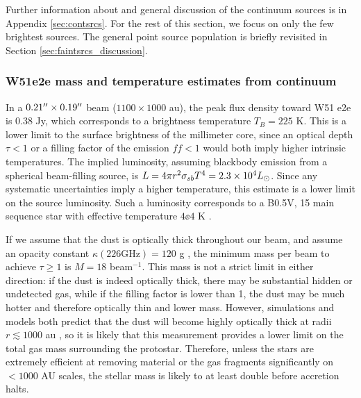 \documentclass{emulateapj}
\begin{document}
Further information about and general discussion of the continuum sources is in
Appendix \ref{sec:contsrcs}.  For the rest of this section, we focus on only
the few brightest sources.  The general point source population is briefly
revisited in Section \ref{sec:faintsrcs_discussion}.








\subsubsection{W51e2e mass and temperature estimates from continuum}
\label{sec:W51e2e}

In a $0.21\mbox{$^{\prime\prime}$}\times0.19\mbox{$^{\prime\prime}$}$ beam ($1100\times1000$ au), the peak flux
density toward W51 e2e is 0.38 Jy, which corresponds to a brightness
temperature $T_B=225$ K.  This is a lower limit to the surface brightness of
the millimeter core, since an optical depth $\tau<1$ or a filling factor of the
emission $ff<1$ would both imply higher intrinsic temperatures.  The implied
luminosity, assuming blackbody emission from a spherical beam-filling source,
is $L = 4\pi r^2 \sigma_{sb} T^4 = 2.3\times10^{4} L_{\odot}$.  Since any systematic
uncertainties imply a higher temperature, this estimate is a lower limit on the
source luminosity.  Such a luminosity corresponds to a B0.5V, 15 \msun main
sequence star with effective temperature $4\ee{4}$ K \citep[][see
Section \ref{sec:stellarproperties} for further discussion of
stellar types]{Pecaut2013a}.


If we assume that the dust is optically thick throughout our beam, and assume
an opacity constant $\kappa(226 \mathrm{GHz})=120$ g \persc, the minimum mass
per beam to achieve $\tau\geq1$ is $M=18$ \msun beam$^{-1}$.  This  mass is not
a strict limit in either direction: if the dust is indeed optically thick,
there may be substantial hidden or undetected gas, while if the filling factor
is lower than 1, the dust may be much hotter and therefore optically thin and
lower  mass.  However, simulations and models both predict that the dust will
become highly optically thick at radii $r\lesssim1000$ au
\citep{Forgan2016a,Klassen2016a}, so it is likely that this measurement
provides  a lower limit on the total gas mass surrounding the protostar.
Therefore, unless the stars are extremely efficient at removing material or the
gas fragments significantly on $<1000$ AU scales, the stellar mass is likely to
at least double before accretion halts.
\end{document}
